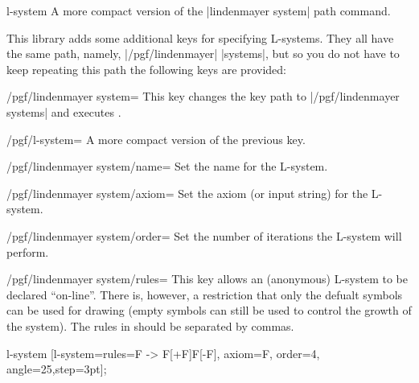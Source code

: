 \begin{pathoperation}{l-system}{ }
  A more compact version of the |lindenmayer system| path command.
\end{pathoperation}

This library adds some additional keys for specifying L-systems. They
all have the same path, namely, |/pgf/lindenmayer| |systems|, but so 
you do not have to keep repeating this path the following keys are 
provided:
 
\begin{stylekey}{/pgf/lindenmayer system=}
This key changes the key path to |/pgf/lindenmayer systems| and
executes .
\end{stylekey}

\begin{stylekey}{/pgf/l-system=}
A more compact version of the previous key.
\end{stylekey}

\begin{key}{/pgf/lindenmayer system/name=}
  Set the name for the L-system. 
\end{key}

\begin{key}{/pgf/lindenmayer system/axiom=}
  Set the axiom (or input string) for the L-system. 
\end{key}

\begin{key}{/pgf/lindenmayer system/order=}
  Set the number of iterations the L-system will perform.
\end{key}

\begin{key}{/pgf/lindenmayer system/rules=}
  This key allows an (anonymous) L-system to be declared ``on-line''.
  There is, however, a restriction that only the defualt symbols can be
  used for drawing (empty symbols can still be used to control
  the growth of the system). The rules in  should
  be separated by commas.
  
\begin{codeexample}[]
\tikz[rotate=65] l-system
  [l-system={rules={F -> F[+F]F[-F]}, axiom=F, order=4, angle=25,step=3pt}];
\end{codeexample} 
\end{key}

